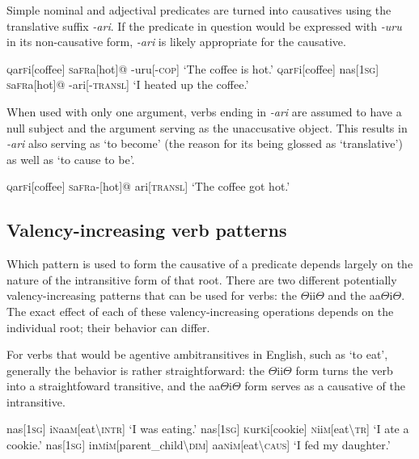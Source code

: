 \documentclass[a4paper,10pt,twoside,openright]{memoir}
\newcommand{\rootpart}{$\Theta$}
\newcommand{\famwordold}[5]{#1\textsc{#2}#3\textsc{#4}#5}
\begin{document}
Simple nominal and adjectival predicates are turned into causatives using the translative suffix \textit{-ari}. If the predicate in question would be expressed with \textit{-uru} in its non-causative form, \textit{-ari} is likely appropriate for the causative.

\pex
\a
\begingl
\famwordold{}{q}{ar}{f}{i}[coffee]
\famwordold{}{s}{a}{fr}{a}[hot]@
-uru[\textsc{-cop}]
\glft `The coffee is hot.'
\endgl
\a
\begingl
\famwordold{}{q}{ar}{f}{i}[coffee]
nas[\textsc{1sg}]
\famwordold{}{s}{a}{fr}{a}[hot]@
-ari[-\textsc{transl}]
\glft `I heated up the coffee.'
\endgl
\xe

When used with only one argument, verbs ending in \textit{-ari} are assumed to have a null subject and the argument serving as the unaccusative object. This results in \textit{-ari} also serving as `to become' (the reason for its being glossed as `translative') as well as `to cause to be'.

\ex
\begingl
\famwordold{}{q}{ar}{f}{i}[coffee]
\famwordold{}{s}{a}{fr}{a}-[hot]@
ari[\textsc{transl}]
\glft `The coffee got hot.'
\endgl
\xe

\subsection{Valency-increasing verb patterns}

Which pattern is used to form the causative of a predicate depends largely on the nature of the intransitive form of that root. There are two different potentially valency-increasing patterns that can be used for verbs: the {\rootpart}ii{\rootpart} and the aa{\rootpart}i{\rootpart}. The exact effect of each of these valency-increasing operations depends on the individual root; their behavior can differ.

For verbs that would be agentive ambitransitives in English, such as `to eat', generally the behavior is rather straightforward: the {\rootpart}ii{\rootpart} form turns the verb into a straightfoward transitive, and the aa{\rootpart}i{\rootpart} form serves as a causative of the intransitive. 

\pex
\a
\begingl
nas[\textsc{1sg}]
\famwordold{i}{n}{aa}{m}{}[eat\textbackslash\textsc{intr}]
\glft `I was eating.'
\endgl
\a
\begingl
nas[\textsc{1sg}]
\famwordold{}{k}{ur}{k}{i}[cookie]
\famwordold{}{n}{ii}{m}{}[eat\textbackslash\textsc{tr}]
\glft `I ate a cookie.'
\endgl
\a
\begingl
nas[\textsc{1sg}]
\famwordold{in}{m}{i}{m}{}[parent\_child\textbackslash\textsc{dim}]
\famwordold{aa}{n}{i}{m}{}[eat\textbackslash\textsc{caus}]
\glft `I fed my daughter.'
\endgl
\xe
\end{document}

